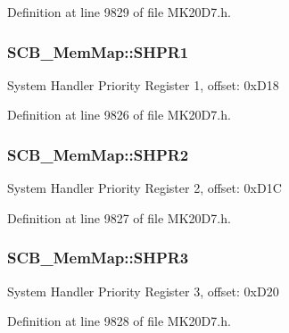 Definition at line 9829 of file M\+K20\+D7.\+h.

\subsubsection[{\texorpdfstring{S\+H\+P\+R1}{SHPR1}}]{ S\+C\+B\+\_\+\+Mem\+Map\+::\+S\+H\+P\+R1}\hypertarget{struct_s_c_b___mem_map_afe02d5ca0102ec35b79172d453854ed0}{}\label{struct_s_c_b___mem_map_afe02d5ca0102ec35b79172d453854ed0}
System Handler Priority Register 1, offset\+: 0x\+D18 

Definition at line 9826 of file M\+K20\+D7.\+h.

\subsubsection[{\texorpdfstring{S\+H\+P\+R2}{SHPR2}}]{ S\+C\+B\+\_\+\+Mem\+Map\+::\+S\+H\+P\+R2}\hypertarget{struct_s_c_b___mem_map_a1636322022eb10e4acedf40018708b68}{}\label{struct_s_c_b___mem_map_a1636322022eb10e4acedf40018708b68}
System Handler Priority Register 2, offset\+: 0x\+D1C 

Definition at line 9827 of file M\+K20\+D7.\+h.

\subsubsection[{\texorpdfstring{S\+H\+P\+R3}{SHPR3}}]{ S\+C\+B\+\_\+\+Mem\+Map\+::\+S\+H\+P\+R3}\hypertarget{struct_s_c_b___mem_map_a8ac3a3b8dd23fb279640b98a95fb796a}{}\label{struct_s_c_b___mem_map_a8ac3a3b8dd23fb279640b98a95fb796a}
System Handler Priority Register 3, offset\+: 0x\+D20 

Definition at line 9828 of file M\+K20\+D7.\+h.

